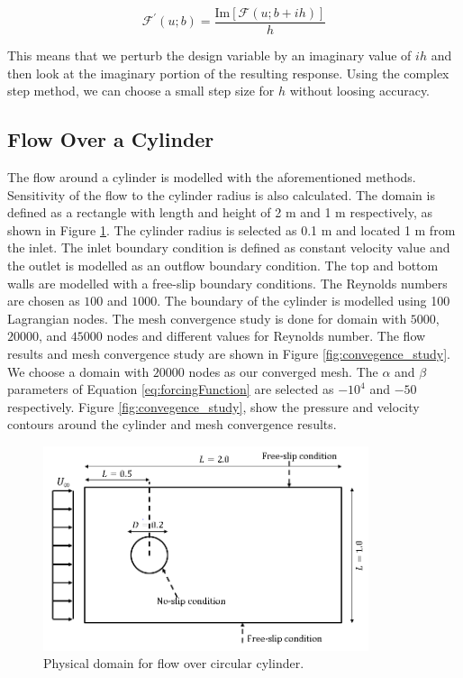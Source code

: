 \documentclass[12pt]{aiaa-pretty}
\begin{document}
%
\begin{equation}\label{eq:compelxStepFormula}
	\mathcal{F}^\prime\left(u; b\right) = \frac{\text{Im}\left[ \mathcal{F}\left(u; b + ih\right) \right]}{h}
\end{equation}
%

This means that we perturb the design variable by an imaginary value of $ih$ and then look at the imaginary portion of the resulting response. Using the complex step method, we can choose a small step size for $h$ without loosing accuracy.

\subsection{Flow Over a Cylinder}
The flow around a cylinder is modelled with the aforementioned methods. Sensitivity of the flow to the cylinder radius is also calculated. The domain is defined as a rectangle with length and height of 2 m and 1 m respectively, as shown in Figure \ref{fig:cylinderDomain}. The cylinder radius is selected as 0.1 m and located 1 m from the inlet. The inlet boundary condition is defined as constant velocity value and the outlet is modelled as an outflow boundary condition. The top and bottom walls are modelled with a free-slip boundary conditions. The Reynolds numbers are chosen as $100$ and $1000$. The boundary of the cylinder is modelled using 100 Lagrangian nodes. The mesh convergence study is done for domain with $5000$, $20000$, and $45000$ nodes and different values for Reynolds number. The flow results and mesh convergence study are shown in Figure \ref{fig:convegence_study}. We choose a domain with $20000$ nodes as our converged mesh. The $\alpha$ and $\beta$ parameters of Equation \eqref{eq:forcingFunction} are selected as $-10^4$ and $-50$ respectively. Figure \ref{fig:convegence_study}, show the pressure and velocity contours around the cylinder and mesh convergence results.

%
\begin{figure}[H]
	\centering
	\includegraphics[height=6.0cm]{figure/cylinder/domain.png}
	\caption{Physical domain for flow over circular cylinder.}
	\label{fig:cylinderDomain}
\end{figure}
%
\end{document}
